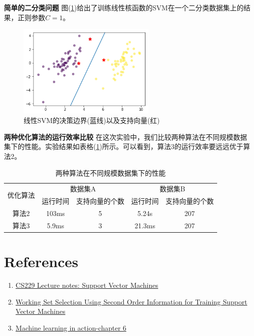 \documentclass[11pt]{article}
\begin{document}
\textbf{简单的二分类问题 }图(\ref{exp:1})给出了训练线性核函数的SVM在一个二分类数据集上的结果，正则参数$C=1$。
\begin{figure}
\centering
\includegraphics[width=0.6\textwidth]{images/img16.png}
\caption{线性SVM的决策边界(蓝线)以及支持向量(红)}
\label{exp:1}
\end{figure}

\textbf{两种优化算法的运行效率比较 }在这次实验中，我们比较两种算法在不同规模数据集下的性能。实验结果如表格(\ref{exp:2})所示。可以看到，算法3的运行效率要远远优于算法2。
\begin{table}
\caption{两种算法在不同规模数据集下的性能}
\label{exp:2}
\centering
\begin{tabular}{c|cc|cc}
\hline
\multirow{2}{4em}{优化算法} & \multicolumn{2}{c|}{数据集A} & \multicolumn{2}{c}{数据集B} \\ 
& 运行时间 & 支持向量的个数 & 运行时间 & 支持向量的个数  \\ 
\hline
算法2 & 103ms & 5 & 5.24s &207\\
算法3 & 5.9ms & 3 & 21.3ms & 207\\
\hline
\end{tabular}
\end{table}

\section{References}
\begin{enumerate}
\item\href{http://202.116.81.74/cache/1/03/cs229.stanford.edu/f92d1f9eccf4dde766e9eba3f8231233/cs229-notes3.pdf}{CS229 Lecture notes: Support Vector Machines}
\item\href{http://www.jmlr.org/papers/volume6/fan05a/fan05a.pdf}{Working Set Selection Using Second Order Information for Training Support Vector Machines}
\item\href{http://www2.ift.ulaval.ca/~chaib/IFT-4102-7025/public_html/Fichiers/Machine_Learning_in_Action.pdf}{Machine learning in action-chapter 6}
\end{enumerate}
\end{document}
